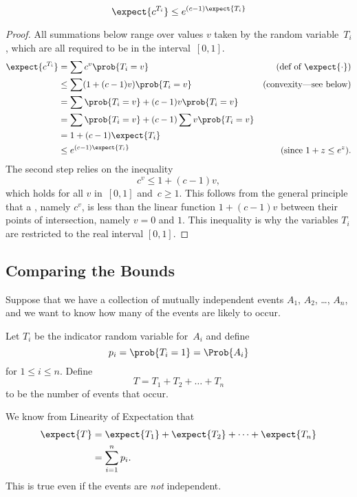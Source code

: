 \begin{lemma}
\label{chernoff-lemma2}
\[
    \expect{c^{T_i}} \leq e^{(c - 1) \expect{T_i}}
\]
\end{lemma}

\begin{proof}
All summations below range over values $v$ taken by the random
variable~$T_i$, which are all required to be in the interval~$[0, 1]$.
\begin{align*}
\expect{c^{T_i}}
     & = \sum c^v \prob{T_i = v}
              & \text{(def of $\expect{\cdot}$)}\\
     & \leq \sum (1 + (c-1) v) \prob{T_i = v} 
          & \text{(convexity---see below)}\\
     & = \sum \prob{T_i = v} + (c-1) v \prob{T_i = v} \\
     & = \sum \prob{T_i = v} +  (c-1) \sum v \prob{T_i = v} \\
     & = 1 + (c - 1) \expect{T_i} \\
     & \leq e^{(c - 1) \expect{T_i}}
           & \text{(since $1 + z \leq e^z$)}.
\end{align*}
The second step relies on the inequality
\[
c^v \leq 1 + (c-1) v,
\]
which holds for all $v$ in~$[0, 1]$ and~$c \geq 1$.  This follows from
the general principle that a , namely $c^v$, is
less than the linear function $1 + (c-1) v$ between their points of
intersection, namely $v = 0$ and $1$.  This inequality is why the
variables $T_i$ are restricted to the real interval $[0, 1]$.
\end{proof}

\subsection{Comparing the Bounds}

Suppose that we have a collection of mutually independent events $A_1$,
$A_2$, \dots, $A_n$, and we want to know how many of the events are
likely to occur.

Let $T_i$ be the indicator random variable for~$A_i$ and define
\begin{equation*}
    p_i = \prob{T_i = 1} = \Prob{A_i}
\end{equation*}
for $1 \le i \le n$.  Define
\begin{equation*}
    T = T_1 + T_2 + \dots + T_n
\end{equation*}
to be the number of events that occur.

We know from Linearity of Expectation that
\begin{align*}
\expect{T}
    &= \expect{T_1} + \expect{T_2} + \dots + \expect{T_n} \\
    &= \sum_{i = 1}^n p_i.
\end{align*}
This is true even if the events are \emph{not} independent.

